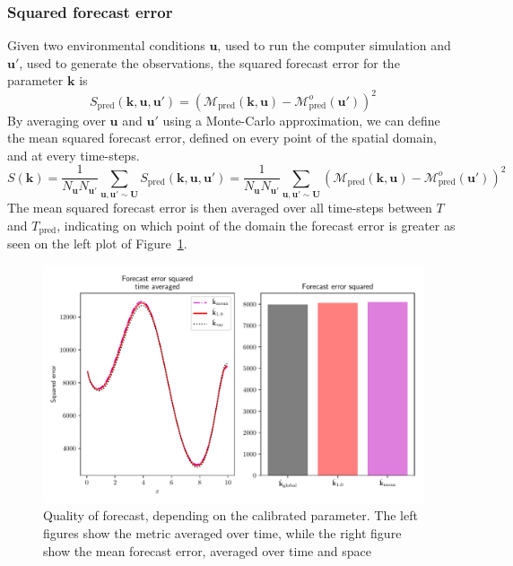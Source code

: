 \documentclass[preprint, 1p]{elsarticle}
\begin{document}
\subsubsection{Squared forecast error}
Given two environmental conditions $\mathbf{u}$, used to run the computer simulation and $\mathbf{u}'$, used to generate the observations, the squared forecast error for the parameter $\mathbf{k}$ is
\begin{equation}
\label{eq:squared_forecast_error}
S_{\mathrm{pred}}(\mathbf{k},\mathbf{u},\mathbf{u}') = \left(\mathcal{M}_{\mathrm{pred}}(\mathbf{k},\mathbf{u}) - \mathcal{M}^{o}_{\mathrm{pred}}(\mathbf{u}')\right)^2
\end{equation}
By averaging over $\mathbf{u}$ and $\mathbf{u}'$ using a Monte-Carlo approximation, we can define the mean squared forecast error, defined on every point of the spatial domain, and at every time-steps.
\begin{equation}
  \label{eq:squared_forecast_error_averaged}
  S(\mathbf{k}) = \frac{1}{N_{\mathbf{u}} N_{\mathbf{u}'}}\sum_{\mathbf{u},\mathbf{u}'\sim \mathbf{U}} S_{\mathrm{pred}}(\mathbf{k},\mathbf{u},\mathbf{u}') = \frac{1}{N_{\mathbf{u}} N_{\mathbf{u}'}}\sum_{\mathbf{u},\mathbf{u}'\sim \mathbf{U}} \left(\mathcal{M}_{\mathrm{pred}}(\mathbf{k},\mathbf{u}) - \mathcal{M}^{o}_{\mathrm{pred}}(\mathbf{u}')\right)^2
\end{equation}
The mean squared forecast error is then averaged over all time-steps between $T$ and $T_{\mathrm{pred}}$, indicating on which point of the domain the forecast error is greater as seen on the left plot of Figure~\ref{fig:forecast_squared_error}.
\begin{figure}[!h]
\centering
\includegraphics[width=.9\textwidth]{Figures/forecast_error.pdf}
\caption{Quality of forecast, depending on the calibrated parameter. The left figures show the metric averaged over time, while the right figure show the mean forecast error, averaged over time and space}
\label{fig:forecast_squared_error}
\end{figure}
\end{document}
